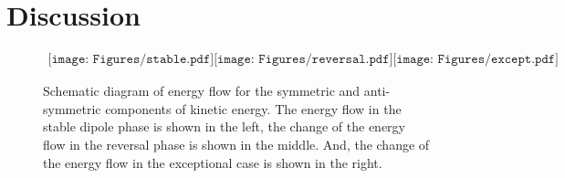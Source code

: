 \section{Discussion}

%
\begin{figure}[ht]
\begin{center}
\[
\begin{array}{ccc}
\texttt{[image: Figures/stable.pdf]}
\texttt{[image: Figures/reversal.pdf]}
\texttt{[image: Figures/except.pdf]}
\end{array}
\]
\end{center}
\caption{
Schematic diagram of energy flow for the symmetric and anti-symmetric components of kinetic energy. The energy flow in the stable dipole phase is shown in the left, the change of the energy flow in the reversal phase is shown in the middle. And, the change of the energy flow in the exceptional case is shown in the right.
}
\label{Fig:schematic_reversal}
\end{figure}
